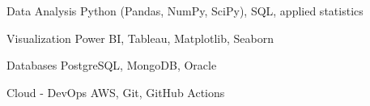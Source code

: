 
\begin{cvskills}

\cvskill
{Data Analysis}
{Python (Pandas, NumPy, SciPy), SQL, applied statistics}

\cvskill
{Visualization}
{Power BI, Tableau, Matplotlib, Seaborn}

\cvskill
{Databases}
{PostgreSQL, MongoDB, Oracle}

\cvskill
{Cloud - DevOps}
{AWS, Git, GitHub Actions}

\end{cvskills}

